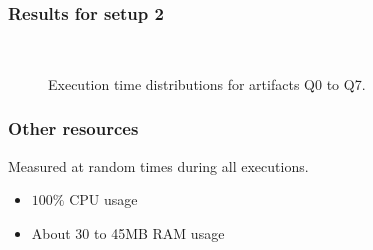 \documentclass[xcolor=dvipsnames]{beamer}
\begin{document}
	\begin{frame}
		\frametitle{Results for setup 2}
		\begin{figure}[h!]
			\centering
			\qquad
			\\
			\qquad
			\caption{Execution time distributions for artifacts Q0 to Q7.}
		\end{figure}
	\end{frame}
	
	\begin{frame}
		\frametitle{Other resources}
		Measured at random times during all executions.
		\begin{itemize}
			\item $100\%$ CPU usage
			\item About 30 to 45MB RAM usage
		\end{itemize}
	\end{frame}
	
\end{document}
